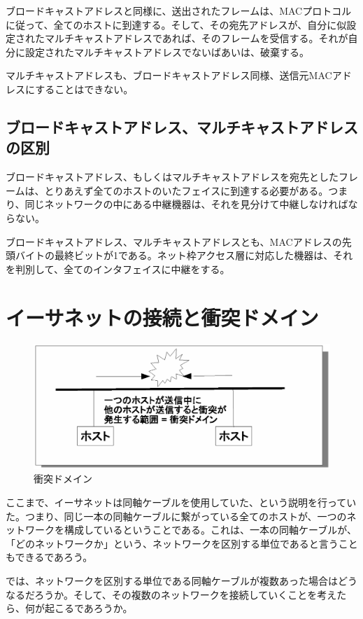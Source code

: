 ブロードキャストアドレスと同様に、送出されたフレームは、MACプロトコルに従って、全てのホストに到達する。そして、その宛先アドレスが、自分に似設定されたマルチキャストアドレスであれば、そのフレームを受信する。それが自分に設定されたマルチキャストアドレスでないばあいは、破棄する。

マルチキャストアドレスも、ブロードキャストアドレス同様、送信元MACアドレスにすることはできない。

\subsection{ブロードキャストアドレス、マルチキャストアドレスの区別}
ブロードキャストアドレス、もしくはマルチキャストアドレスを宛先としたフレームは、とりあえず全てのホストのいたフェイスに到達する必要がある。つまり、同じネットワークの中にある中継機器は、それを見分けて中継しなければならない。

ブロードキャストアドレス、マルチキャストアドレスとも、MACアドレスの先頭バイトの最終ビットが1である。ネット枠アクセス層に対応した機器は、それを判別して、全てのインタフェイスに中継をする。

\section{イーサネットの接続と衝突ドメイン}

\begin{figure}[htbp]
	\includegraphics[width=12cm,clip]{draw/collisiondomain.eps}
	\caption{衝突ドメイン}
	\label{fig:collisiondomain}
\end{figure}

ここまで、イーサネットは同軸ケーブルを使用していた、という説明を行っていた。つまり、同じ一本の同軸ケーブルに繋がっている全てのホストが、一つのネットワークを構成しているということである。これは、一本の同軸ケーブルが、「どのネットワークか」という、ネットワークを区別する単位であると言うこともできるであろう。

では、ネットワークを区別する単位である同軸ケーブルが複数あった場合はどうなるだろうか。そして、その複数のネットワークを接続していくことを考えたら、何が起こるであろうか。

